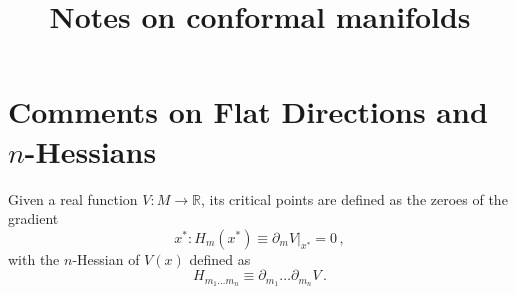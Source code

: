 \documentclass[11pt]{article}
\title{Notes on conformal manifolds}
\author{}
\begin{document}
\maketitle



\tableofcontents


\section{Comments on Flat Directions and $n$-Hessians} \label{sec: hessians}

Given a real function $V: M \rightarrow \mathbb R$, its critical points are defined as the zeroes of the gradient
%
\begin{equation}
	x^*: H_{m}(x^*)\equiv\partial_mV\big\vert_{x^*}=0\,,
\end{equation}
%
with the $n$-Hessian of $V(x)$ defined as
%
\begin{equation}
	H_{m_1\dots m_n}\equiv\partial_{m_1}\dots\partial_{m_n}V\,.
\end{equation}
%
\end{document}
